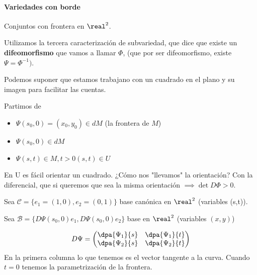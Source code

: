 \paragraph{Variedades con borde}

Conjuntos con frontera en $\real^2$.

Utilizamos la tercera caracterización de subvariedad, que dice que existe un \textbf{difeomorfismo} que vamos a llamar $\Phi$, (que por ser difeomorfismo, existe $\Psi = \Phi^{-1})$.

Podemos suponer que estamos trabajano con un cuadrado en el plano y su imagen para facilitar las cuentas.

Partimos de \begin{itemize}
\item $\Psi(s_0,0) = (x_0,y_0)\in dM$ (la frontera de $M$)
\item $\Psi(s_0,0) \in dM$
\item $\Psi(s,t) \in M, t>0 (s,t)\in U$
\end{itemize}

En U es fácil orientar un cuadrado. ¿Cómo nos "llevamos" la orientación? Con la diferencial, que si queremos que sea la misma orientación $\implies \det D\Phi > 0$.

Sea $\mathcal{C} = \{e_1=(1,0),e_2=(0,1)\}$ base canónica en $\real^2$ (variables (s,t)).

Sea $\mathcal{B} = \{D\Psi(s_0,0)e_1,D\Psi(s_0,0)e_2\}$ base en $\real^2$ (variables $(x,y)$)

\[D\Psi = \begin{pmatrix}
\dpa{\Psi_1}{s} &\dpa{\Psi_1}{t}\\
\dpa{\Psi_2}{s} &\dpa{\Psi_2}{t}
\end{pmatrix}\]
En la primera columna lo que tenemos es el vector tangente a la curva. Cuando $t=0$ tenemos la parametrización de la frontera.